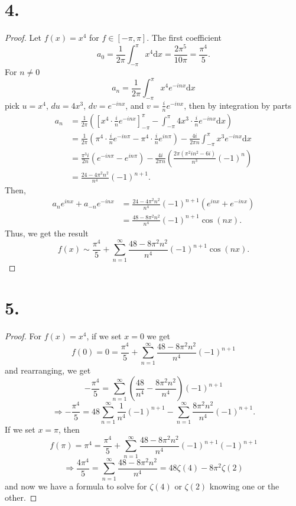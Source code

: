 \documentclass{article}
\begin{document}
\section*{4.}
\begin{proof}
  Let $f(x) = x^4$ for $f \in [-\pi, \pi]$. The first coefficient 
  \[
  a_0 = \frac{1}{2 \pi}\int_{-\pi}^{\pi}x^4 \mathrm{d}x = \frac{2 \pi^5}{10 \pi} = \frac{\pi^4}{5}.  
  \]
  For $n \neq 0$
  \[
  a_n = \frac{1}{2 \pi} \int_{-\pi}^{\pi}x^4e^{-inx}\mathrm{d}x  
  \]
  pick $u = x^4$, $du = 4x^3$, $dv = e^{-inx}$, and $v = \frac{i}{n}e^{-inx}$, then by integration by parts
  \begin{align*}
    a_n &= \frac{1}{2 \pi }\left(\left[x^4\cdot \frac{i}{n}e^{-inx} \right]_{-\pi}^{\pi} - \int_{-\pi}^{\pi}4x^3 \cdot \frac{i}{n}e^{-inx} \mathrm{d}x \right)\\
    &= \frac{1}{2 \pi}\left(\pi^4 \cdot \frac{i}{n}e^{-in\pi}-\pi^4 \cdot \frac{i}{n}e^{in\pi}\right) - \frac{4 i}{2 \pi n} \int_{-\pi}^{\pi}x^3 e^{-inx} \mathrm{d}x\\
    &= \frac{\pi^3i}{2n}\left(e^{-in \pi} - e^{in \pi} \right) - \frac{4i}{2 \pi n}\left(\frac{2 \pi (\pi^2 i n^2 -6i)}{n^3}(-1)^n \right) \\
    &= \frac{24 - 4\pi^2n^2}{n^4}(-1)^{n + 1}.
  \end{align*}
  Then, 
  \begin{align*}
    a_ne^{inx} + a_{-n}e^{-inx} &= \frac{24 - 4 \pi^2 n^2}{n^4}(-1)^{n + 1} \left(e^{inx} + e^{-inx} \right) \\
    &= \frac{48 - 8 \pi^2 n^2}{n^4}(-1)^{n + 1}\cos(nx).
  \end{align*}
  Thus, we get the result
  \[
  f(x) \sim \frac{\pi^4}{5} + \sum\limits_{n = 1}^{\infty}\frac{48 - 8\pi^2n^2}{n^4}(-1)^{n + 1} \cos(nx).  
  \]
\end{proof}
\section*{5.}
\begin{proof}
  For $f(x) = x^4$, if we set $x = 0$ we get
  \[
  f(0) = 0 = \frac{\pi^4}{5} + \sum\limits_{n = 1}^{\infty}\frac{48 - 8 \pi^2 n^2}{n^4}(-1)^{n + 1}  
  \]
  and rearranging, we get 
  \[
  -\frac{\pi^4}{5} = \sum\limits_{n = 1}^{\infty}\left(\frac{48}{n^4}-\frac{8 \pi^2n^2}{n^4}\right) (-1)^{n + 1}  
  \]
  \[
  \Rightarrow -\frac{\pi^4}{5} = 48\sum\limits_{n = 1}^{\infty}\frac{1}{n^4}(-1)^{n + 1} - \sum\limits_{n = 1}^{\infty} \frac{8 \pi^2 n^2}{n^4}(-1)^{n + 1}.  
  \]
  If we set $x = \pi$, then 
  \[
  f(\pi) = \pi^4 = \frac{\pi^4}{5} + \sum\limits_{n = 1}^{\infty} \frac{48 - 8 \pi^2 n^2}{n^4}(-1)^{n + 1} (-1)^{n + 1}
  \]
  \[
  \Rightarrow \frac{4 \pi^4}{5} = \sum\limits_{n = 1}^{\infty}\frac{48 - 8 \pi^2n^2}{n^4} = 48 \zeta(4) - 8\pi^2 \zeta(2)  
  \]
  and now we have a formula to solve for $\zeta(4)$ or $\zeta(2)$ knowing one or the other. 
\end{proof}
\end{document}
